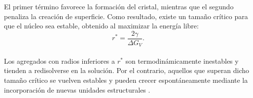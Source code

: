 \documentclass[12pt,letterpaper,oneside]{report}
\begin{document}
El primer término favorece la formación del cristal, mientras que el segundo penaliza la creación de superficie. Como resultado, existe un tamaño crítico para que el núcleo sea estable, obtenido al maximizar la energía libre:\\

\begin{equation}
r^{*}
=
\frac{2\gamma}{\Delta G_{V}}.
\label{eq:r_critico}
\end{equation}\\

Los agregados con radios inferiores a $r^{*}$ son termodinámicamente inestables y tienden a redisolverse en la solución. Por el contrario, aquellos que superan dicho tamaño crítico se vuelven estables y pueden crecer espontáneamente mediante la incorporación de nuevas unidades estructurales \cite{Erdemir2009}.\\





\end{document}
